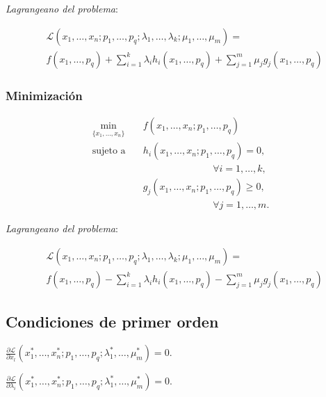 \documentclass[8pt,a4paper]{extarticle}
\begin{document}
\begin{multicols}{3}
\emph{Lagrangeano del problema}:

\begin{equation*}
\begin{aligned}
	& \mathcal{L}(x_1, \ldots, x_n; p_1, \ldots, p_q; \lambda_1, \ldots, \lambda_k; \mu_1, \ldots, \mu_m) = \\
	& f(x_1,\ldots, p_q) + \sum_{i=1}^{k}\lambda_i h_i (x_1, \ldots, p_q) + \sum_{j=1}^{m}\mu_j g_j (x_1, \ldots, p_q)
\end{aligned}
\end{equation*}

\subsubsection*{Minimización}

\begin{equation*}
\begin{aligned}
	\min_{\{x_1, \ldots, x_n\}}\ & f(x_1, \ldots, x_n; p_1, \ldots, p_q) \\
	\text{sujeto a} \quad		& h_i(x_1, \ldots, x_n; p_1, \ldots, p_q) = 0,\\ & \qquad \qquad \qquad \quad \, \forall i = 1, \ldots, k, \\
								& g_j(x_1, \ldots, x_n; p_1, \ldots, p_q) \ge 0,\\ & \qquad \qquad \qquad \quad \, \forall j = 1, \ldots, m.
\end{aligned}
\end{equation*}

\emph{Lagrangeano del problema}:

\begin{equation*}
\begin{aligned}
	& \mathcal{L}(x_1, \ldots, x_n; p_1, \ldots, p_q; \lambda_1, \ldots, \lambda_k; \mu_1, \ldots, \mu_m) = \\
	& f(x_1,\ldots, p_q) - \sum_{i=1}^{k}\lambda_i h_i (x_1, \ldots, p_q) - \sum_{j=1}^{m}\mu_j g_j (x_1, \ldots, p_q)
\end{aligned}
\end{equation*}

\sectionbreak

\subsection*{Condiciones de primer orden}

\begin{bulletlist}
\item $\displaystyle \frac{\partial \mathcal{L}}{\partial x_l} (x_{1}^{*}, \ldots, x_{n}^{*}; p_1, \ldots, p_q; \lambda_{1}^{*}, \ldots, \mu_{m}^{*}) = 0$.
\item $\displaystyle \frac{\partial \mathcal{L}}{\partial \lambda_i} (x_{1}^{*}, \ldots, x_{n}^{*}; p_1, \ldots, p_q; \lambda_{1}^{*}, \ldots, \mu_{m}^{*}) = 0$.
\end{bulletlist}


\end{multicols}
\end{document}
